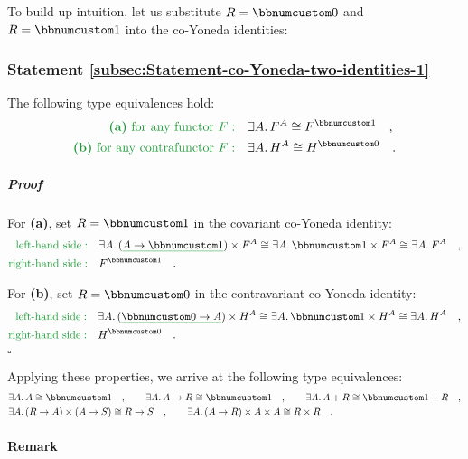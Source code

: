 To build up intuition, let us substitute $R=\bbnum 0$ and $R=\bbnum 1$
into the co-Yoneda identities:

\subsubsection{Statement \label{subsec:Statement-co-Yoneda-two-identities-1}\ref{subsec:Statement-co-Yoneda-two-identities-1}}

The following type equivalences hold:
\begin{align*}
{\color{greenunder}\text{\textbf{(a)} for any functor }F:}\quad & \exists A.\,F^{A}\cong F^{\bbnum 1}\quad,\\
{\color{greenunder}\text{\textbf{(b)} for any contrafunctor }F:}\quad & \exists A.\,H^{A}\cong H^{\bbnum 0}\quad.
\end{align*}


\subparagraph{Proof}

For \textbf{(a)}, set $R=\bbnum 1$ in the covariant co-Yoneda identity:
\begin{align*}
{\color{greenunder}\text{left-hand side}:}\quad & \exists A.\,(\gunderline{A\rightarrow\bbnum 1})\times F^{A}\cong\exists A.\,\bbnum 1\times F^{A}\cong\exists A.\,F^{A}\quad,\\
{\color{greenunder}\text{right-hand side}:}\quad & F^{\bbnum 1}\quad.
\end{align*}

For \textbf{(b)}, set $R=\bbnum 0$ in the contravariant co-Yoneda
identity:
\begin{align*}
{\color{greenunder}\text{left-hand side}:}\quad & \exists A.\,(\gunderline{\bbnum 0\rightarrow A})\times H^{A}\cong\exists A.\,\bbnum 1\times H^{A}\cong\exists A.\,H^{A}\quad,\\
{\color{greenunder}\text{right-hand side}:}\quad & H^{\bbnum 0}\quad.
\end{align*}
 $\square$

Applying these properties, we arrive at the following type equivalences:
\begin{align*}
 & \exists A.\,A\cong\bbnum 1\quad,\quad\quad\exists A.\,A\rightarrow R\cong\bbnum 1\quad,\quad\quad\exists A.\,A+R\cong\bbnum 1+R\quad,\\
 & \exists A.\,(R\rightarrow A)\times(A\rightarrow S)\cong R\rightarrow S\quad,\quad\quad\exists A.\,(A\rightarrow R)\times A\times A\cong R\times R\quad.
\end{align*}


\paragraph{Remark}

